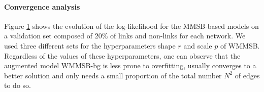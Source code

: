 \begin{table}
\centering
	
\label{table:roc}
\end{table}

%
%
\paragraph {Convergence analysis} %
Figure \ref{fig:conv_entropy} shows the evolution of the log-likelihood for the MMSB-based models on a validation set composed of 20\% of links and non-links for each network. We used three different sets for the hyperparameters shape $r$ and scale $p$ of WMMSB. Regardless of the values of these hyperparameters, one can observe that the augmented model WMMSB-bg is less prone to overfitting, usually converges to a better solution and only needs a small proportion of the total number $N^2$ of edges to do so.

\begin{figure}[h]
\centering
	
    \label{fig:conv_entropy}
\end{figure}


